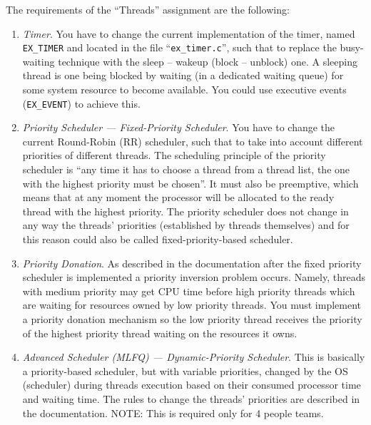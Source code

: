 The requirements of the ``Threads'' assignment are the following:
\begin{enumerate}
    \item \textit{Timer}. You have to change the current implementation of the timer, named \texttt{EX\_TIMER} and located in the file ``\texttt{ex\_timer.c}'', such that to replace the busy-waiting technique with the sleep -- wakeup (block -- unblock) one. A sleeping thread is one being blocked by waiting (in a dedicated waiting queue) for some system resource to become available. You could use executive events (\texttt{EX\_EVENT}) to achieve this.
    
    \item \textit{Priority Scheduler --- Fixed-Priority Scheduler}. You have to change the current Round-Robin (RR) scheduler, such that to take into account different priorities of different threads. The scheduling principle of the priority scheduler is ``any time it has to choose a thread from a thread list, the one with the highest priority must be chosen''. It must also be preemptive, which means that at any moment the processor will be allocated to the ready thread with the highest priority. The priority scheduler does not change in any way the threads' priorities (established by threads themselves) and for this reason could also be called fixed-priority-based scheduler. 

    \item \textit{Priority Donation}. As described in the \OSName{} documentation after the fixed priority scheduler is implemented a priority inversion problem occurs. Namely, threads with medium priority may get CPU time before high priority threads which are waiting for resources owned by low priority threads. You must implement a priority donation mechanism so the low priority thread receives the priority of the highest priority thread waiting on the resources it owns.
    
    \item \textit{Advanced Scheduler (MLFQ) --- Dynamic-Priority Scheduler}. This is basically a priority-based scheduler, but with variable priorities, changed by the OS (scheduler) during threads execution based on their consumed processor time and waiting time. The rules to change the threads' priorities are described in the \OSName{} documentation. NOTE: This is required only for 4 people teams.

\end{enumerate}



